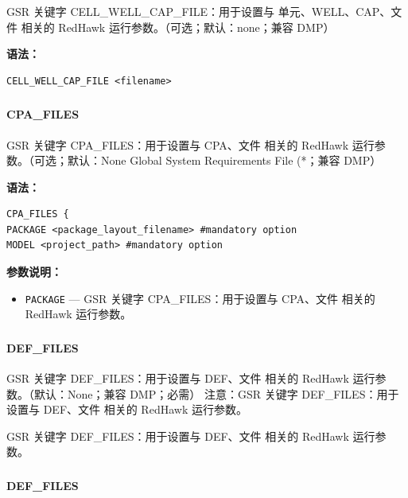 GSR 关键字 CELL_WELL_CAP_FILE：用于设置与 单元、WELL、CAP、文件 相关的 RedHawk 运行参数。（可选；默认：none；兼容 DMP）

\textbf{语法：}
\begin{lstlisting}
CELL_WELL_CAP_FILE <filename>
\end{lstlisting}

\subsubsection{}
\paragraph*{CPA_FILES}

GSR 关键字 CPA_FILES：用于设置与 CPA、文件 相关的 RedHawk 运行参数。（可选；默认：None Global System Requirements File (*；兼容 DMP）

\textbf{语法：}
\begin{lstlisting}
CPA_FILES {
PACKAGE <package_layout_filename> #mandatory option
MODEL <project_path> #mandatory option
\end{lstlisting}

\textbf{参数说明：}
\begin{itemize}
\item \texttt{PACKAGE} — GSR 关键字 CPA\_FILES：用于设置与 CPA、文件 相关的 RedHawk 运行参数。
\end{itemize}

\subsubsection{}
\paragraph*{DEF_FILES}

GSR 关键字 DEF_FILES：用于设置与 DEF、文件 相关的 RedHawk 运行参数。（默认：None；兼容 DMP；必需） 注意：GSR 关键字 DEF_FILES：用于设置与 DEF、文件 相关的 RedHawk 运行参数。

\begin{noteBox}
GSR 关键字 DEF\_FILES：用于设置与 DEF、文件 相关的 RedHawk 运行参数。
\end{noteBox}

\subsubsection{}
\paragraph*{DEF_FILES}

